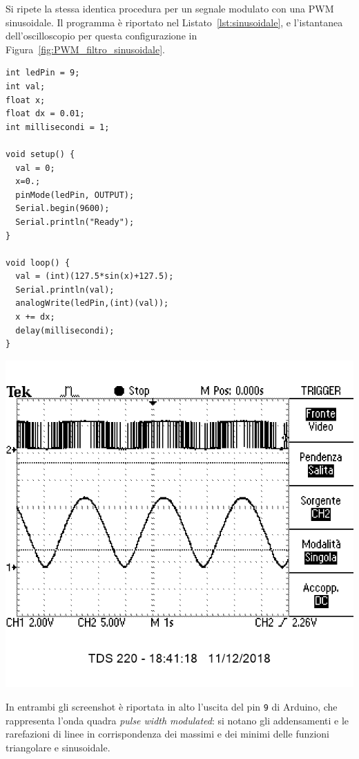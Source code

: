 \documentclass[10pt,oneside,a4paper]{article}
\newenvironment{Figure}
  {\par\medskip\noindent\minipage{\linewidth}}
  {\endminipage\par\medskip}
\begin{document}
\begin{multicols}{2}
Si ripete la stessa identica procedura per un segnale modulato con una PWM sinusoidale. Il programma è riportato nel Listato~\ref{lst:sinusoidale}, e l'istantanea dell'oscilloscopio per questa configurazione in Figura~\ref{fig:PWM_filtro_sinusoidale}.

\begin{lstlisting}[style=CStyle, caption={Codice per la scrittura PWM, modulazione sinusoidale}, label=lst:sinusoidale]
int ledPin = 9;
int val;
float x;
float dx = 0.01;
int millisecondi = 1;

void setup() {
  val = 0;
  x=0.;
  pinMode(ledPin, OUTPUT);
  Serial.begin(9600);
  Serial.println("Ready");
}

void loop() {
  val = (int)(127.5*sin(x)+127.5);
  Serial.println(val);
  analogWrite(ledPin,(int)(val));
  x += dx;
  delay(millisecondi);
}
\end{lstlisting}

\begin{Figure}
	\begin{center}
	\includegraphics[width=0.9\linewidth]{sinusoide2.png}
	\label{fig:PWM_filtro_sinusoidale}
	\end{center}
\end{Figure}

In entrambi gli screenshot è riportata in alto l'uscita del pin \texttt{9} di Arduino, che rappresenta l'onda quadra \emph{pulse width modulated}: si notano gli addensamenti e le rarefazioni di linee in corrispondenza dei massimi e dei minimi delle funzioni triangolare e sinusoidale.



\end{multicols}
\end{document}
